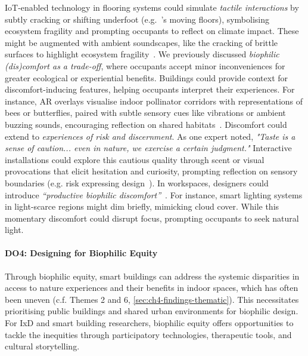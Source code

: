 IoT-enabled technology in flooring systems could simulate \emph{tactile interactions} by subtly cracking or shifting underfoot (e.g.~\citet{economidou2021moving}'s moving floors), symbolising ecosystem fragility and prompting occupants to reflect on climate impact. These might be augmented with ambient soundscapes, like the cracking of brittle surfaces to highlight ecosystem fragility~\cite{barclay2019acoustic}. We previously discussed \emph{biophilic (dis)comfort as a trade-off}, where occupants accept minor inconveniences for greater ecological or experiential benefits. Buildings could provide context for discomfort-inducing features, helping occupants interpret their experiences. For instance, AR overlays visualise indoor pollinator corridors with representations of bees or butterflies, paired with subtle sensory cues like vibrations or ambient buzzing sounds, encouraging reflection on shared habitats~\cite{mcclain2022using}. Discomfort could extend to \emph{experiences of risk and discernment}. As one expert noted, \textit{"Taste is a sense of caution... even in nature, we exercise a certain judgment."} Interactive installations could explore this cautious quality through scent or visual provocations that elicit hesitation and curiosity, prompting reflection on sensory boundaries (e.g. risk expressing design~\cite{disalvo2014making}). In workspaces, designers could introduce \emph{``productive biophilic discomfort''}~\cite{alpert2022productive}. For instance, smart lighting systems in light-scarce regions might dim briefly, mimicking cloud cover. While this momentary discomfort could disrupt focus, prompting occupants to seek natural light.


\paragraph{DO4: Designing for Biophilic Equity}
Through biophilic equity, smart buildings can address the systemic disparities in access to nature experiences and their benefits in indoor spaces, which has often been uneven (c.f. Themes 2 and 6, \autoref{sec:ch4-findings-thematic}). This necessitates prioritising public buildings and shared urban environments for biophilic design. For IxD and smart building researchers, biophilic equity offers opportunities to tackle the inequities through participatory technologies, therapeutic tools, and cultural storytelling. 

